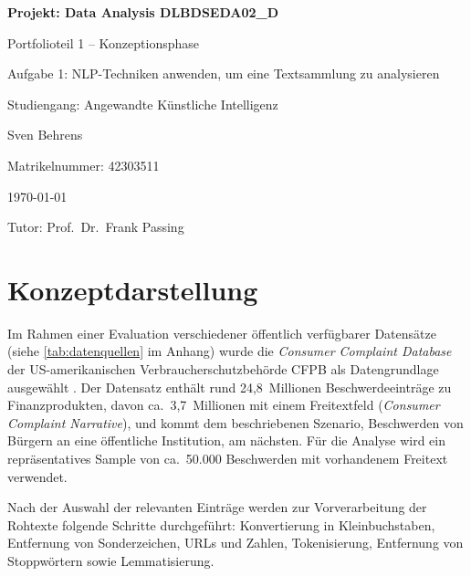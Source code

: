 \documentclass[a4paper,11pt]{article}
\begin{document}
\begin{titlepage}
    \thispagestyle{empty}
    \centering
    \vspace*{5cm}
    {\Huge\bfseries Projekt: Data Analysis DLBDSEDA02\_D \par}
    \vspace{1cm}
    {\Large Portfolioteil 1 -- Konzeptionsphase \par}
    \vspace{0.3cm}
    {\large Aufgabe 1: NLP-Techniken anwenden, um eine Textsammlung zu analysieren \par}
    \vspace{0.5cm}
    {\large Studiengang: Angewandte Künstliche Intelligenz \par}
    \vspace{0.5cm}
    {\large Sven Behrens \par}
    \vspace{0.5cm}
    {\large Matrikelnummer: 42303511 \par}
    \vspace{0.5cm}
    {\large \today \par}
    \vspace{0.5cm}
    {\large Tutor: Prof.~Dr.~Frank Passing \par}
\end{titlepage}

\setcounter{page}{1}

\section{Konzeptdarstellung}

Im Rahmen einer Evaluation verschiedener öffentlich verfügbarer Datensätze (siehe \cref{tab:datenquellen} im Anhang) wurde
die \textit{Consumer Complaint Database} der US-amerikanischen Verbraucherschutzbehörde CFPB als Datengrundlage
ausgewählt \parencite{cfpb2024}. Der Datensatz enthält rund 24,8~Millionen Beschwerdeeinträge zu
Finanzprodukten, davon ca.~3,7~Millionen mit einem Freitextfeld (\textit{Consumer Complaint Narrative}),
und kommt dem beschriebenen Szenario,
Beschwerden von Bürgern an eine öffentliche Institution, am nächsten. Für die Analyse wird ein
repräsentatives Sample von ca.\ 50.000 Beschwerden mit vorhandenem Freitext verwendet.

Nach der Auswahl der relevanten Einträge werden zur Vorverarbeitung der Rohtexte folgende Schritte
durchgeführt: Konvertierung in Kleinbuchstaben, Entfernung von Sonderzeichen, URLs und Zahlen,
Tokenisierung, Entfernung von Stoppwörtern sowie Lemmatisierung.
\end{document}
